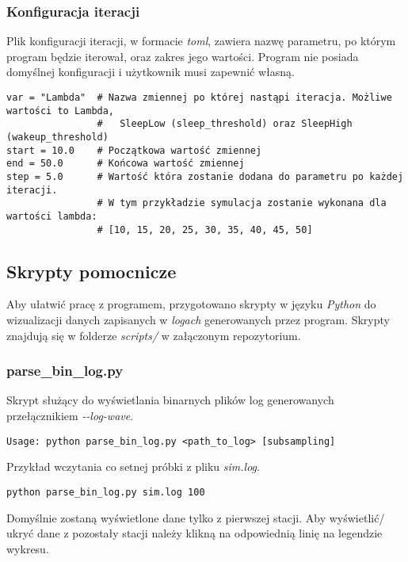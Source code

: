 \subsubsection{Konfiguracja iteracji}
Plik konfiguracji iteracji, w formacie \emph{toml}, zawiera nazwę parametru, po którym program będzie iterował, oraz zakres jego wartości. Program nie posiada domyślnej konfiguracji i użytkownik musi zapewnić własną.

{
\selectfont 
\begin{verbatim}
var = "Lambda"  # Nazwa zmiennej po której nastąpi iteracja. Możliwe wartości to Lambda,
                #   SleepLow (sleep_threshold) oraz SleepHigh (wakeup_threshold)
start = 10.0    # Początkowa wartość zmiennej
end = 50.0      # Końcowa wartość zmiennej
step = 5.0      # Wartość która zostanie dodana do parametru po każdej iteracji.
                # W tym przykładzie symulacja zostanie wykonana dla wartości lambda:
                # [10, 15, 20, 25, 30, 35, 40, 45, 50]
\end{verbatim}
}

\subsection{Skrypty pomocnicze}\label{python_scripts}
Aby ułatwić pracę z programem, przygotowano skrypty w języku \emph{Python} do wizualizacji danych zapisanych w \emph{logach} generowanych przez program. Skrypty znajdują się w folderze \emph{scripts/} w załączonym repozytorium.

\subsubsection{parse\_bin\_log.py}
Skrypt służący do wyświetlania binarnych plików log generowanych przełącznikiem \emph{-{}-log-wave}.
{
\selectfont 
\begin{verbatim}
Usage: python parse_bin_log.py <path_to_log> [subsampling]
\end{verbatim}
}

\noindent Przykład wczytania co setnej próbki z pliku \emph{sim.log}.
{
\selectfont 
\begin{verbatim}
python parse_bin_log.py sim.log 100
\end{verbatim}
}
\noindent Domyślnie zostaną wyświetlone dane tylko z pierwszej stacji. Aby wyświetlić/ ukryć dane z pozostały stacji należy klikną na odpowiednią linię na legendzie wykresu.

